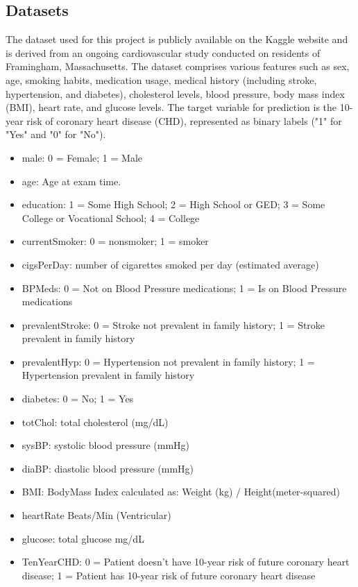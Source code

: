 \documentclass[11pt]{article}
\begin{document}
\subsection{Datasets}
\text The dataset used for this project is publicly available on the Kaggle website and is derived from an ongoing cardiovascular study conducted on residents of Framingham, Massachusetts. The dataset comprises various features such as sex, age, smoking habits, medication usage, medical history (including stroke, hypertension, and diabetes), cholesterol levels, blood pressure, body mass index (BMI), heart rate, and glucose levels. The target variable for prediction is the 10-year risk of coronary heart disease (CHD), represented as binary labels ("1" for "Yes" and "0" for "No").
\begin{itemize}
    \item male: 0 = Female; 1 = Male
    \item age: Age at exam time.
    \item education: 1 = Some High School; 2 = High School or GED; 3 = Some College or Vocational School; 4 = College
    \item currentSmoker: 0 = nonsmoker; 1 = smoker
    \item cigsPerDay: number of cigarettes smoked per day (estimated average)
    \item BPMeds: 0 = Not on Blood Pressure medications; 1 = Is on Blood Pressure medications
    \item prevalentStroke: 0 = Stroke not prevalent in family history; 1 = Stroke prevalent in family history
    \item prevalentHyp: 0 = Hypertension not prevalent in family history; 1 = Hypertension prevalent in family history
    \item diabetes: 0 = No; 1 = Yes
    \item totChol: total cholesterol (mg/dL)
    \item sysBP: systolic blood pressure (mmHg)
    \item diaBP: diastolic blood pressure (mmHg)
    \item BMI: BodyMass Index calculated as: Weight (kg) / Height(meter-squared)
    \item heartRate Beats/Min (Ventricular)
    \item glucose: total glucose mg/dL
    \item TenYearCHD: 0 = Patient doesn’t have 10-year risk of future coronary heart disease; 1 = Patient has 10-year risk of future coronary heart disease
\end{itemize}
\end{document}
